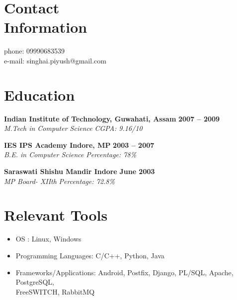 \documentclass[margin,line]{resume}
\begin{document}
\begin{resume}

    \section{\mysidestyle Contact\\Information}

       				                      \hfill phone: 09990683539          \vspace{0mm}\\\vspace{0mm}%
        					      \hfill e-mail: singhai.piyush@gmail.com  \vspace{0mm}\vspace{-4.5mm}%

    \section{\mysidestyle Education}

    \textbf{Indian Institute of Technology, Guwahati, Assam} \hfill \textbf{2007 -- 2009}\vspace{0mm}\\\vspace{0mm}%
    \textsl{M.Tech in Computer Science} \hfill \textsl{CGPA: 9.16/10}

    \textbf{IES IPS Academy Indore, MP} \hfill \textbf{2003 -- 2007}\vspace{0mm}\\\vspace{0mm}%
    \textsl{B.E. in Computer Science} \hfill \textsl{Percentage: 78\%}

    \textbf{Saraswati Shishu Mandir Indore} \hfill \textbf{June 2003}\vspace{0mm}\\\vspace{0mm}%
    \textsl{MP Board- XIIth} \hfill \textsl{Percentage: 72.8\%}

    \section{\mysidestyle Relevant Tools}
     \begin{itemize}
      \item OS : Linux, Windows
      \item Programming Languages: C/C++, Python, Java
      \item Frameworks/Applications: Android, Postfix, Django, PL/SQL, Apache, PostgreSQL,\\ 
            FreeSWITCH, RabbitMQ
     \end{itemize}


\end{resume}
\end{document}
